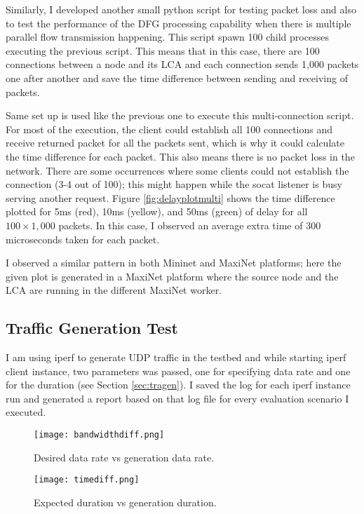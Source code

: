 Similarly, I developed another small python script for testing packet loss and also to test the performance of the DFG processing capability when there is multiple parallel flow transmission happening. This script spawn 100 child processes executing the previous script. This means that in this case, there are 100 connections between a node and its LCA and each connection sends 1,000 packets one after another and save the time difference between sending and receiving of packets.

Same set up is used like the previous one to execute this multi-connection script. For most of the execution, the client could establish all 100 connections and receive returned packet for all the packets sent, which is why it could calculate the time difference for each packet. This also means there is no packet loss in the network. There are some occurrences where some clients could not establish the connection (3-4 out of 100); this might happen while the socat listener is busy serving another request. Figure \ref{fig:delayplotmulti} shows the time difference plotted for 5ms (red), 10ms (yellow), and 50ms (green) of delay for all $100\times1,000$ packets. In this case, I observed an average extra time of 300 microseconds taken for each packet.

I observed a similar pattern in both Mininet and MaxiNet platforms; here the given plot is generated in a MaxiNet platform where the source node and the LCA are running in the different MaxiNet worker.

\subsection{Traffic Generation Test}
I am using iperf to generate UDP traffic in the testbed and while starting iperf client instance, two parameters was passed, one for specifying data rate and one for the duration (see Section \ref{sec:tragen}). I saved the log for each iperf instance run and generated a report based on that log file for every evaluation scenario I executed.

\begin{figure}[tb]
	\begin{center}
		\resizebox{\textwidth}{!}
		{\texttt{[image: bandwidthdiff.png]}}
		\caption{Desired data rate vs generation data rate.}
		\label{fig:bandwidthdiff}
	\end{center}
\end{figure}

\begin{figure}[tb]
	\begin{center}
		\resizebox{\textwidth}{!}
		{\texttt{[image: timediff.png]}}
		\caption{Expected duration vs generation duration.}
		\label{fig:timediff}
	\end{center}
\end{figure}

